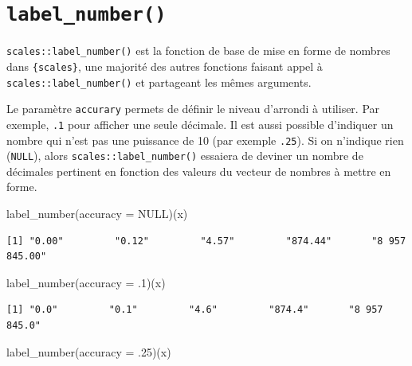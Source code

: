 \documentclass[
  letterpaper,
  DIV=11,
  numbers=noendperiod,
  oneside]{scrreprt}
\newenvironment{Shaded}{\begin{snugshade}}{\end{snugshade}}
\newcommand{\AttributeTok}[1]{\textcolor[rgb]{0.40,0.45,0.13}{#1}}
\newcommand{\ConstantTok}[1]{\textcolor[rgb]{0.56,0.35,0.01}{#1}}
\newcommand{\DecValTok}[1]{\textcolor[rgb]{0.68,0.00,0.00}{#1}}
\newcommand{\FunctionTok}[1]{\textcolor[rgb]{0.28,0.35,0.67}{#1}}
\newcommand{\NormalTok}[1]{\textcolor[rgb]{0.00,0.23,0.31}{#1}}
\begin{document}
\hypertarget{label_number}{%
\section{\texorpdfstring{\texttt{label\_number()}}{label\_number()}}\label{label_number}}

\texttt{scales::label\_number()} est la fonction de base de mise en
forme de nombres dans \texttt{\{scales\}}, une majorité des autres
fonctions faisant appel à \texttt{scales::label\_number()} et partageant
les mêmes arguments.

Le paramètre \texttt{accurary} permets de définir le niveau d'arrondi à
utiliser. Par exemple, \texttt{.1} pour afficher une seule décimale. Il
est aussi possible d'indiquer un nombre qui n'est pas une puissance de
10 (par exemple \texttt{.25}). Si on n'indique rien (\texttt{NULL}),
alors \texttt{scales::label\_number()} essaiera de deviner un nombre de
décimales pertinent en fonction des valeurs du vecteur de nombres à
mettre en forme.

\begin{Shaded}
\begin{Highlighting}[]
\FunctionTok{label\_number}\NormalTok{(}\AttributeTok{accuracy =} \ConstantTok{NULL}\NormalTok{)(x)}
\end{Highlighting}
\end{Shaded}

\begin{verbatim}
[1] "0.00"         "0.12"         "4.57"         "874.44"       "8 957 845.00"
\end{verbatim}

\begin{Shaded}
\begin{Highlighting}[]
\FunctionTok{label\_number}\NormalTok{(}\AttributeTok{accuracy =}\NormalTok{ .}\DecValTok{1}\NormalTok{)(x)}
\end{Highlighting}
\end{Shaded}

\begin{verbatim}
[1] "0.0"         "0.1"         "4.6"         "874.4"       "8 957 845.0"
\end{verbatim}

\begin{Shaded}
\begin{Highlighting}[]
\FunctionTok{label\_number}\NormalTok{(}\AttributeTok{accuracy =}\NormalTok{ .}\DecValTok{25}\NormalTok{)(x)}
\end{Highlighting}
\end{Shaded}
\end{document}
